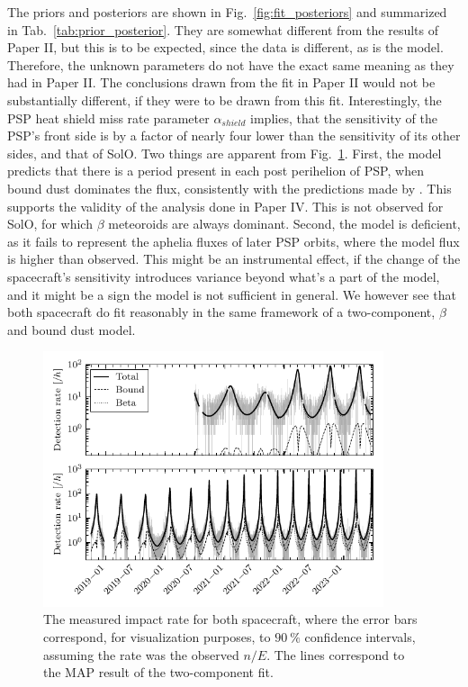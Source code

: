 The priors and posteriors are shown in Fig.~\ref{fig:fit_posteriors} and summarized in Tab.~\ref{tab:prior_posterior}. They are somewhat different from the results of Paper II, but this is to be expected, since the data is different, as is the model. Therefore, the unknown parameters do not have the exact same meaning as they had in Paper II. The conclusions drawn from the fit in Paper II would not be substantially different, if they were to be drawn from this fit. Interestingly, the PSP heat shield miss rate parameter $\alpha_{shield}$ implies, that the sensitivity of the PSP's front side is by a factor of nearly four lower than the sensitivity of its other sides, and that of SolO. Two things are apparent from Fig.~\ref{fig:fit_rate}. First, the model predicts that there is a period present in each post perihelion of PSP, when bound dust dominates the flux, consistently with the predictions made by \citep{szalay2020near,szalay2021collisional}. This supports the validity of the analysis done in Paper IV. This is not observed for SolO, for which $\beta$ meteoroids are always dominant. Second, the model is deficient, as it fails to represent the aphelia fluxes of later PSP orbits, where the model flux is higher than observed. This might be an instrumental effect, if the change of the spacecraft's sensitivity introduces variance beyond what's a part of the model, and it might be a sign the model is not sufficient in general. We however see that both spacecraft do fit reasonably in the same framework of a two-component, $\beta$ and bound dust model. 

\begin{figure}[h]
 	\centering
 	\includegraphics[width=10cm]{figures/both_shield_rate_log.pdf}
 	\caption{The measured impact rate for both spacecraft, where the error bars correspond, for visualization purposes, to $\SI{90}{\%}$ confidence intervals, assuming the rate was the observed $n/E$. The lines correspond to the MAP result of the two-component fit.}
 	\label{fig:fit_rate}
\end{figure}







